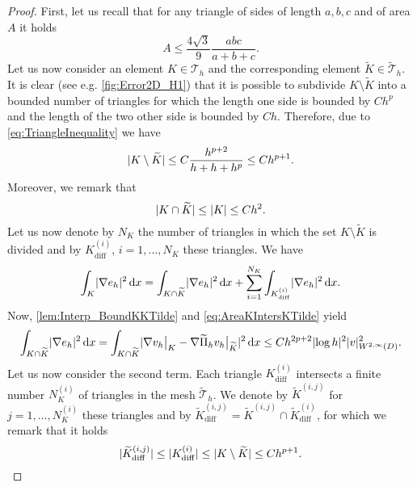 \begin{proof} First, let us recall that for any triangle of sides of length $a, b, c$ and of area $A$ it holds \cite{CuB67}
	\begin{equation}\label{eq:TriangleInequality}
		A \leq \frac{4\sqrt{3}}{9} \frac{abc}{a+b+c}.
	\end{equation}
	Let us now consider an element $K \in \mathcal T_h$ and the corresponding element $\widetilde K \in \widetilde{\mathcal T}_h$. It is clear (see e.g. \cref{fig:Error2D_H1}) that it is possible to subdivide $K \setminus \widetilde K$ into a bounded number of triangles for which the length one side is bounded by $Ch^p$ and the length of the two other side is bounded by $Ch$. Therefore, due to \eqref{eq:TriangleInequality} we have
	\begin{equation}\label{eq:AreaKMinusKTilde}
		\lvert K \setminus \widetilde K\rvert \leq C \frac{h^{p+2}}{h + h + h^p} \leq Ch^{p+1}.
	\end{equation}
	Moreover, we remark that
	\begin{equation}\label{eq:AreaKIntersKTilde}
		\lvert K \cap \widetilde K\rvert \leq \lvert K\rvert \leq Ch^2.
	\end{equation}
	Let us now denote by $N_K$ the number of triangles in which the set $K\setminus \widetilde K$ is divided and by $K_{\mathrm{diff}}^{(i)}$, $i= 1, \ldots, N_K$ these triangles. We have
	\begin{equation}
		\int_K \lvert\nabla e_h\rvert^2 \,\mathrm{d} x = \int_{K \cap \widetilde K} \lvert\nabla  e_h\rvert^2 \,\mathrm{d} x+ \sum_{i=1}^{N_K} \int_{K_{\mathrm{diff}}^{(i)}}\lvert\nabla  e_h\rvert^2 \,\mathrm{d} x.
	\end{equation}
	Now, \cref{lem:Interp_BoundKKTilde} and \eqref{eq:AreaKIntersKTilde} yield
	\begin{equation}\label{eq:IntegralKIntersKTilde}
		\int_{K \cap \widetilde K} \lvert\nabla  e_h\rvert^2 \,\mathrm{d} x = \int_{K \cap \widetilde K} \lvert\nabla v_h\bigr\rvert_{K} - \nabla \widetilde \Pi_h v_h \bigr\rvert_{\widetilde K}\rvert^2 \,\mathrm{d} x \leq C h^{2p+2} \lvert\log h\rvert^2 \lvert v\rvert_{W^{2, \infty}(D)}^2.
	\end{equation}
	Let us now consider the second term. Each triangle $K_{\mathrm{diff}}^{(i)}$ intersects a finite number $N_K^{(i)}$ of triangles in the mesh $\widetilde{\mathcal T}_h$. We denote by $\widetilde K^{(i,j)}$ for $j = 1, \ldots, N_K^{(i)}$ these triangles and by $\widetilde K^{(i,j)}_{\mathrm{diff}} = \widetilde K^{(i,j)} \cap \widetilde K^{(i)}_{\mathrm{diff}}$, for which we remark that it holds
	\begin{equation}
		\abs{\widetilde K_{\mathrm{diff}}^{(i,j)}}\leq\abs{K_{\mathrm{diff}}^{(i)}}\leq\abs{K\setminus\widetilde K} \leq Ch^{p+1}.

\end{equation}
\end{proof}
